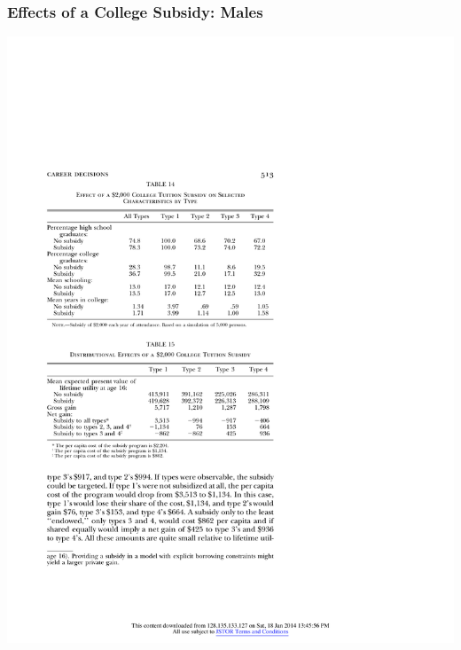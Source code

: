 \begin{frame}
	\frametitle{Effects of a College Subsidy: Males}
		\includegraphics{tab-figs/table14_1997}
\end{frame}

